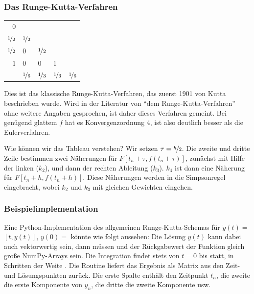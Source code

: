 \subsubsection{Das Runge-Kutta-Verfahren}

\begin{center}
  \renewcommand{\arraystretch}{1.3}
  \begin{tabular}{r|llll}
    0 & \\
    $\nicefrac{1}{2}$ & $\nicefrac{1}{2}$ \\
    $\nicefrac{1}{2}$ & 0 & $\nicefrac{1}{2}$ \\
    1 & 0 & 0 & 1 \\
    \hline
    & $\nicefrac{1}{6}$ &  $\nicefrac{1}{3}$ & 
    $\nicefrac{1}{3}$ &  $\nicefrac{1}{6}$
  \end{tabular}
\end{center}
Dies ist das klassische Runge-Kutta-Verfahren, das zuerst 1901 von
Kutta beschrieben wurde. Wird in der Literatur von "`dem
Runge-Kutta-Verfahren"' ohne weitere Angaben gesprochen, ist daher
dieses Verfahren gemeint. Bei genügend glattem $f$ hat es
Konvergenzordnung 4, ist also deutlich besser als die Eulerverfahren.

Wie können wir das Tableau verstehen?  Wir setzen
$\tau=\nicefrac{h}{2}$. Die zweite und dritte Zeile bestimmen zwei
Näherungen für $F[t_n+\tau, f(t_n+\tau)]$, zunächst mit Hilfe der
linken ($k_2$), und dann der rechten Ableitung ($k_3$). $k_4$ ist dann
eine Näherung für $F[t_n+h, f(t_n+h)]$. Diese Näherungen werden in die
Simpsonregel eingebracht, wobei $k_2$ und $k_3$ mit gleichen Gewichten
eingehen.

\subsubsection{Beispielimplementation}

Eine Python-Implementation des allgemeinen Runge-Kutta-Schemas für
$\dot y(t) = $$[t, y(t)]$, $y(0) =$  könnte wie folgt
aussehen:%
%
Die Lösung $y(t)$ kann dabei auch vektorwertig sein, dann müssen
 und der Rückgabewert der Funktion  gleich große
NumPy-Arrays sein. Die Integration findet stets von $t=0$ bis
 statt, in Schritten der Weite .  Die Routine
liefert das Ergebnis als Matrix aus den Zeit- und Lösungspunkten
zurück. Die erste Spalte enthält den Zeitpunkt $t_n$, die zweite die
erste Komponente von $y_n$, die dritte die zweite Komponente usw.

